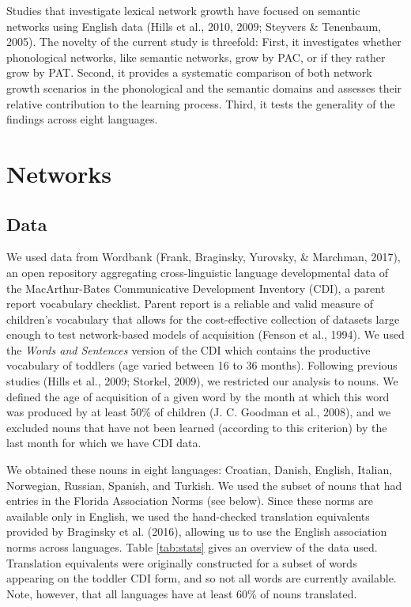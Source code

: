\documentclass[english,floatsintext,man]{apa6}
\theoremstyle{definition}
\theoremstyle{definition}
\theoremstyle{definition}
\theoremstyle{remark}
\begin{document}
Studies that investigate lexical network growth have focused on semantic
networks using English data (Hills et al., 2010, 2009; Steyvers \&
Tenenbaum, 2005). The novelty of the current study is threefold: First,
it investigates whether phonological networks, like semantic networks,
grow by PAC, or if they rather grow by PAT. Second, it provides a
systematic comparison of both network growth scenarios in the
phonological and the semantic domains and assesses their relative
contribution to the learning process. Third, it tests the generality of
the findings across eight languages.

\section{Networks}\label{networks}

\subsection{Data}\label{data}

We used data from Wordbank (Frank, Braginsky, Yurovsky, \& Marchman,
2017), an open repository aggregating cross-linguistic language
developmental data of the MacArthur-Bates Communicative Development
Inventory (CDI), a parent report vocabulary checklist. Parent report is
a reliable and valid measure of children's vocabulary that allows for
the cost-effective collection of datasets large enough to test
network-based models of acquisition (Fenson et al., 1994). We used the
\emph{Words and Sentences} version of the CDI which contains the
productive vocabulary of toddlers (age varied between 16 to 36 months).
Following previous studies (Hills et al., 2009; Storkel, 2009), we
restricted our analysis to nouns. We defined the age of acquisition of a
given word by the month at which this word was produced by at least 50\%
of children (J. C. Goodman et al., 2008), and we excluded nouns that
have not been learned (according to this criterion) by the last month
for which we have CDI data.

We obtained these nouns in eight languages: Croatian, Danish, English,
Italian, Norwegian, Russian, Spanish, and Turkish. We used the subset of
nouns that had entries in the Florida Association Norms (see below).
Since these norms are available only in English, we used the
hand-checked translation equivalents provided by Braginsky et al.
(2016), allowing us to use the English association norms across
languages. Table \ref{tab:stats} gives an overview of the data used.
Translation equivalents were originally constructed for a subset of
words appearing on the toddler CDI form, and so not all words are
currently available. Note, however, that all languages have at least
60\% of nouns translated.
\end{document}
